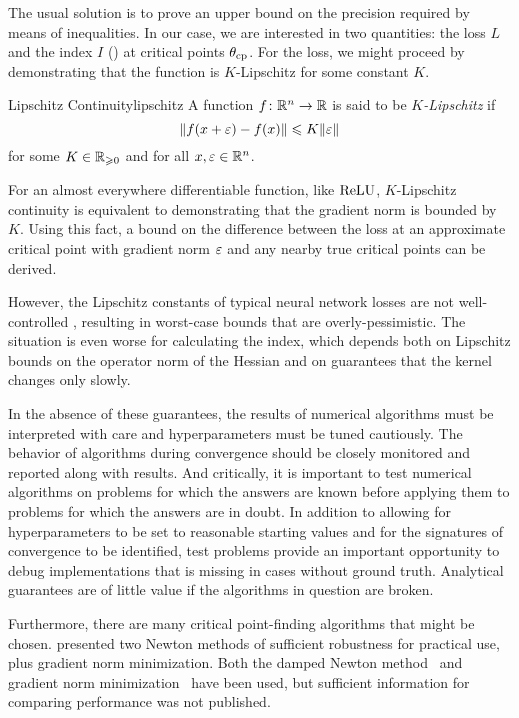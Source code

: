 \documentclass[../../thesis.tex]{subfiles}
\begin{document}
The usual solution is to prove an upper bound on the precision required
by means of inequalities.
In our case, we are interested in two quantities:
the loss $L$ and
the index $I$ ()
at critical points $\theta_{\mathrm{cp}}$.
For the loss,
we might proceed by demonstrating that the function is
$K$-Lipschitz for some constant $K$.

\begin{definition}{Lipschitz Continuity}{lipschitz}
	A function $f\colon \mathbb{R}^n \to \mathbb{R}$ is said to be \emph{$K$-Lipschitz} if
	\begin{equation}
		\lVert f(x + \varepsilon) - f(x)\rVert \leqslant K\lVert\varepsilon\rVert
	\end{equation}
	for some $K\in \mathbb{R}_{\geqslant 0}$ and for all $x,\varepsilon \in \mathbb{R}^n$.
\end{definition}
\noindent For an almost everywhere differentiable function,
like $\mathrm{ReLU}$, $K$-Lipschitz continuity is equivalent to demonstrating
that the gradient norm is bounded by $K$.
Using this fact,
a bound on the difference between the loss
at an approximate critical point with gradient norm $\varepsilon$
and any nearby true critical points can be derived.

However, the Lipschitz constants of typical neural network
losses are not well-controlled
\cite{gouk2018}, %
resulting in worst-case bounds that are overly-pessimistic.
The situation is even worse for calculating the index,
which depends both on Lipschitz bounds on the operator norm
of the Hessian and on guarantees that the kernel changes only slowly.

In the absence of these guarantees,
the results of numerical algorithms must be interpreted with care
and hyperparameters must be tuned cautiously.
The behavior of algorithms during convergence should be closely monitored
and reported along with results.
And critically, it is important to test numerical algorithms
on problems for which the answers are known
before applying them to problems for which the answers are in doubt.
In addition to allowing for hyperparameters to be set to reasonable starting values
and for the signatures of convergence to be identified,
test problems provide an important opportunity to debug implementations
that is missing in cases without ground truth.
Analytical guarantees are of little value
if the algorithms in question are broken.

Furthermore, there are many critical point-finding algorithms that might be chosen.
 presented two Newton methods
of sufficient robustness for practical use,
plus gradient norm minimization.
Both the damped Newton method~\cite{dauphin2014}
and gradient norm minimization~\cite{pennington2017}
have been used,
but sufficient information for comparing performance
was not published.
\end{document}
